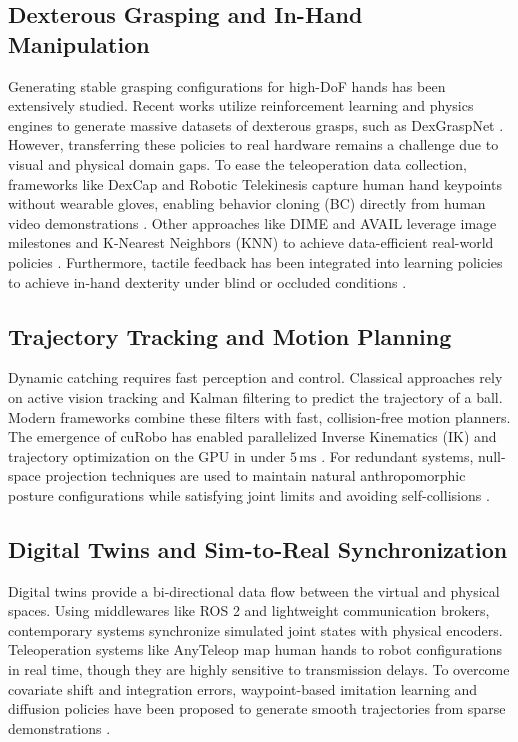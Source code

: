 \documentclass[letterpaper,journal]{IEEEtran}
\begin{document}
\subsection{Dexterous Grasping and In-Hand Manipulation}
Generating stable grasping configurations for high-DoF hands has been extensively studied. Recent works utilize reinforcement learning and physics engines to generate massive datasets of dexterous grasps, such as DexGraspNet \cite{dexgraspnet, lotus_continual}. However, transferring these policies to real hardware remains a challenge due to visual and physical domain gaps. To ease the teleoperation data collection, frameworks like DexCap \cite{dexcap} and Robotic Telekinesis \cite{robotickinesis} capture human hand keypoints without wearable gloves, enabling behavior cloning (BC) directly from human video demonstrations \cite{bimanual_demonstrations, watch_and_act}. Other approaches like DIME \cite{dime} and AVAIL \cite{avail} leverage image milestones and K-Nearest Neighbors (KNN) to achieve data-efficient real-world policies \cite{polytask}. Furthermore, tactile feedback has been integrated into learning policies to achieve in-hand dexterity under blind or occluded conditions \cite{rotating_touch, contact_survey}.

\subsection{Trajectory Tracking and Motion Planning}
Dynamic catching requires fast perception and control. Classical approaches rely on active vision tracking and Kalman filtering to predict the trajectory of a ball. Modern frameworks combine these filters with fast, collision-free motion planners. The emergence of cuRobo \cite{curobo} has enabled parallelized Inverse Kinematics (IK) and trajectory optimization on the GPU in under $5\,\text{ms}$ \cite{curobo}. For redundant systems, null-space projection techniques are used to maintain natural anthropomorphic posture configurations while satisfying joint limits and avoiding self-collisions \cite{wholbody_mpc}.

\subsection{Digital Twins and Sim-to-Real Synchronization}
Digital twins provide a bi-directional data flow between the virtual and physical spaces. Using middlewares like ROS 2 and lightweight communication brokers, contemporary systems synchronize simulated joint states with physical encoders. Teleoperation systems like AnyTeleop \cite{anyteleop} map human hands to robot configurations in real time, though they are highly sensitive to transmission delays. To overcome covariate shift and integration errors, waypoint-based imitation learning \cite{waypoint_il} and diffusion policies \cite{diffusionpolicy, transporter_net} have been proposed to generate smooth trajectories from sparse demonstrations \cite{stabilizetoact, hybrid_hybrid_assembly}.
\end{document}
